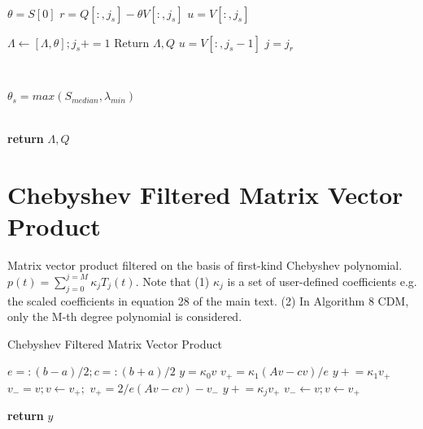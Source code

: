 \documentclass[a4paper]{article}
\begin{document}
\begin{algorithm}
\begin{algorithmic}[1]
    \\
    \State $\theta = S[0]$
    \State $r = Q[:, j_s] - \theta V[:,j_s]$
    \State $u = V[:, j_s]$ 
    
        \State $\Lambda \gets [\Lambda, \theta]; j_s += 1$
            \State  Return $\Lambda, Q$ 
        \EndIf
        \State $u = V[:, j_s -1]$ 
    \EndIf
    \State $j = j_r$
    
    \\

    \State $\theta_s = max(S_{median}, \lambda_{min})$



\EndFor

\\
\State \textbf{return} $\Lambda, Q$ 
\EndProcedure

\end{algorithmic}
\end{algorithm}


\pagebreak


\section{Chebyshev Filtered Matrix Vector Product}
Matrix vector product filtered on the basis of first-kind Chebyshev polynomial. $p(t) =  \sum_{j=0}^{j=M}{\kappa_j T_j(t)}$. Note that (1) $\kappa_j$ is a set of user-defined coefficients e.g. the scaled coefficients in equation 28 of the main text. (2) In Algorithm 8 CDM, only the M-th degree polynomial is considered.  

\begin{algorithm}
\caption{Chebyshev Filtered Matrix Vector Product}\label{alg:ChebAv}
\begin{algorithmic}[1]

\State $e =:(b-a)/2 ; c=: (b+a)/2$
\State $y =  \kappa_0 v$
\State $v_{+} =  \kappa_1 (Av-cv)/e$
\State $y \mathrel{+}=  \kappa_1 v_{+}$
\State $v_{-} = v; v \gets v_{+}; $
    \State $v_{+} =  2/e  (Av - cv) - v_{-}$
    \State $y \mathrel{+}= \kappa_j v_{+}$
    \State $v_{-} \gets v; v \gets v_{+} $

\EndFor



\State \textbf{return} $y$ 

\EndProcedure
\end{algorithmic}
\end{algorithm}
\end{document}
